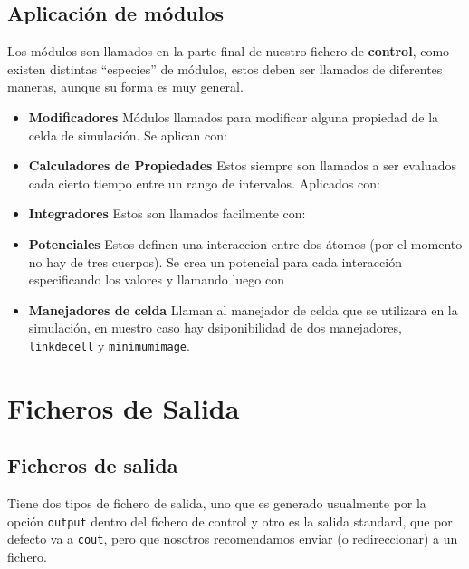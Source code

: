 \subsection{Aplicaci\'on de m\'odulos}

Los m\'odulos son llamados en la parte final de nuestro fichero de \textbf{control}, como existen distintas ``especies'' de m\'odulos, estos deben ser llamados de diferentes maneras, aunque su forma es muy general.

\begin{itemize}
 \item \textbf{Modificadores}
  M\'odulos llamados para modificar alguna propiedad de la celda de simulaci\'on. Se aplican con:
 \item \textbf{Calculadores de Propiedades}
  Estos siempre son llamados a ser evaluados cada cierto tiempo entre un rango de intervalos. Aplicados con:
 \item \textbf{Integradores}
  Estos son llamados facilmente con:
 \item \textbf{Potenciales}
  Estos definen una interaccion entre dos \'atomos (por el momento no hay de tres cuerpos). Se crea un potencial para cada interacci\'on especificando los valores y llamando luego con
 \item \textbf{Manejadores de celda}
  Llaman al manejador de celda que se utilizara en la simulaci\'on, en nuestro caso hay dsiponibilidad de dos manejadores, \verb|linkdecell| y \verb|minimumimage|.
\end{itemize}



\section{Ficheros de Salida}

\subsection{Ficheros de salida}
\lpmd Tiene dos tipos de fichero de salida, uno que es generado usualmente por la opci\'on \verb|output| dentro del fichero de control y otro es la salida standard, que por defecto va a \verb|cout|, pero que nosotros recomendamos enviar (o redireccionar) a un fichero.

